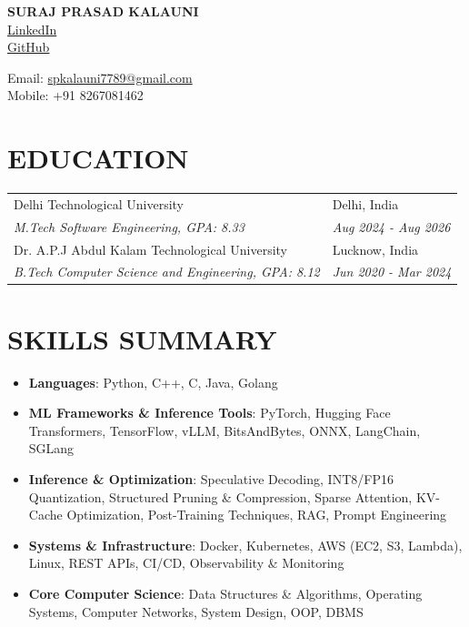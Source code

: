 \documentclass[a4paper,11pt]{article}
\begin{document}
\begin{minipage}[t]{0.5\textwidth}
    \textbf{\Large SURAJ PRASAD KALAUNI}\\
    \href{https://www.linkedin.com/in/surajprasaddtu}{LinkedIn} \\
    \href{https://github.com/surajprasad32}{GitHub}
\end{minipage}
\begin{minipage}[t]{0.5\textwidth}
    \begin{flushright}
        Email: \href{mailto:spkalauni7789@gmail.com}{spkalauni7789@gmail.com}\\
        Mobile: +91 8267081462
    \end{flushright}
\end{minipage}
\vspace{-0.1cm}
\section*{EDUCATION}
\begin{tabular}{@{}p{}p{}@{}}
    Delhi Technological University & Delhi, India \\
    \textit{M.Tech Software Engineering, GPA: 8.33} & \textit{Aug 2024 - Aug 2026} \\
    Dr. A.P.J Abdul Kalam Technological University & Lucknow, India \\
    \textit{B.Tech Computer Science and Engineering, GPA: 8.12} & \textit{Jun 2020 - Mar 2024} \\
\end{tabular}
\vspace{-0.1cm}
\section*{SKILLS SUMMARY}
\begin{itemize}
\item \textbf{Languages}: Python, C++, C, Java, Golang
\vspace{0.05cm}
\item \textbf{ML Frameworks \& Inference Tools}: PyTorch, Hugging Face
Transformers, TensorFlow, vLLM, BitsAndBytes, ONNX, LangChain, SGLang
\vspace{0.05cm}
\item \textbf{Inference \& Optimization}: Speculative Decoding, INT8/FP16
Quantization, Structured Pruning \& Compression, Sparse Attention,
KV-Cache Optimization, Post-Training Techniques, RAG, Prompt Engineering
\vspace{0.05cm}
\item \textbf{Systems \& Infrastructure}: Docker, Kubernetes, AWS (EC2, S3,
Lambda), Linux, REST APIs, CI/CD, Observability \& Monitoring
\item \textbf{Core Computer Science}: Data Structures \& Algorithms, Operating
Systems, Computer Networks, System Design, OOP, DBMS
\end{itemize}
\vspace{-0.1cm}
\end{document}
